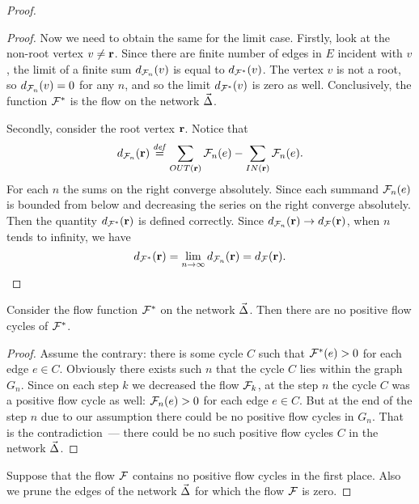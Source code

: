\documentclass[12pt]{article}
\begin{document}
\begin{proof}
\begin{proof}
        Now we need to obtain the same for the limit case.
        Firstly, look at the non-root vertex $v \neq \mathbf{r}$.
        Since there are finite number of edges in $E$ incident with $v$, the limit of
          a finite sum $d_{\mathcal{F}_{n}}(v)$ is equal to $d_{\mathcal{F^{*}}}(v)$.
        The vertex $v$ is not a root, so $d_{\mathcal{F}_{n}}(v) = 0$ for any $n$, and so the limit $d_{\mathcal{F^{*}}}(v)$ is zero as well.
        Conclusively, the function $\mathcal{F^{*}}$ is the flow on the network $\vec{\Delta}$.

        Secondly, consider the root vertex $\mathbf{r}$.
        Notice that
        \[
          d_{\mathcal{F}_{n}}(\mathbf{r}) \overset{\mathit{def}}{=} \sum_{OUT(\mathbf{r})} \mathcal{F}_{n}(e) - \sum_{IN(\mathbf{r})} \mathcal{F}_{n}(e).
        \]
        For each $n$ the sums on the right converge absolutely.
        Since each summand $\mathcal{F}_{n}(e)$ is bounded from below and decreasing the series on the right converge absolutely.
        Then the quantity $d_{\mathcal{F^{*}}}(\mathbf{r})$ is defined correctly.
        Since $d_{\mathcal{F}_{n}}(\mathbf{r}) \to d_{\mathcal{F}}(\mathbf{r})$, when $n$ tends to infinity, we have
        \[
          d_{\mathcal{F^{*}}}(\mathbf{r}) = \lim_{n \to \infty} d_{\mathcal{F}_{n}}(\mathbf{r}) = d_{\mathcal{F}}(\mathbf{r}).
        \]
      \end{proof}
      \begin{prop}
        Consider the flow function $\mathcal{F^{*}}$ on the network $\vec{\Delta}$.
        Then there are no positive flow cycles of $\mathcal{F^{*}}$.
      \end{prop}
      \begin{proof}
        Assume the contrary: there is some cycle $C$ such that $\mathcal{F^{*}}(e) > 0$ for
          each edge $e \in C$.
        Obviously there exists such $n$ that the cycle $C$ lies within the graph $G_n$.
        Since on each step $k$ we decreased the flow $\mathcal{F}_{k}$, at the step $n$
          the cycle $C$ was a positive flow cycle as well: $\mathcal{F}_{n}(e) > 0$ for each edge $e \in C$.
        But at the end of the step $n$ due to our assumption there could be no positive flow cycles in $G_n$.
        That is the contradiction~--- there could be no such positive flow cycles $C$ in the network $\vec{\Delta}$.
      \end{proof}

      Suppose that the flow $\mathcal{F}$ contains no positive flow cycles in the first place.
      Also we prune the edges of the network $\vec{\Delta}$ for which the flow $\mathcal{F}$ is zero.


\end{proof}
\end{document}
